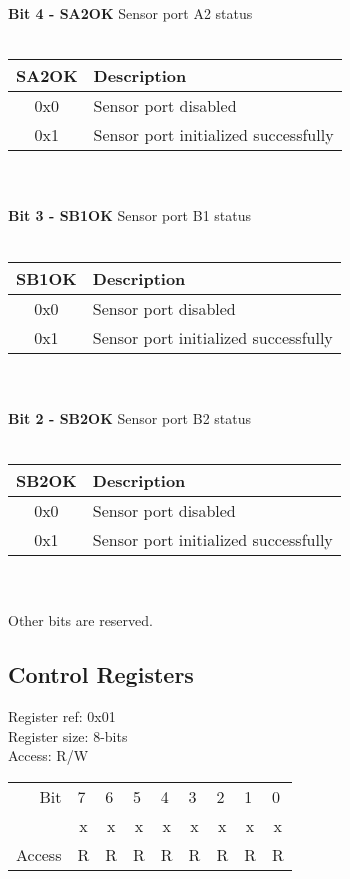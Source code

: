 \textbf{Bit 4 - SA2OK} Sensor port A2 status\\\\
\begin{tabular}{|c|l|}
    \hline
   SA2OK & Description\\ \hline
   0x0 & Sensor port disabled\\ \hline
   0x1 & Sensor port initialized successfully \\ \hline
\end{tabular}\\\\
\textbf{Bit 3 - SB1OK} Sensor port B1 status\\\\
\begin{tabular}{|c|l|}
    \hline
   SB1OK & Description\\ \hline
   0x0 & Sensor port disabled\\ \hline
   0x1 & Sensor port initialized successfully \\ \hline
\end{tabular}\\\\
\textbf{Bit 2 - SB2OK} Sensor port B2 status\\\\
\begin{tabular}{|c|l|}
    \hline
   SB2OK & Description\\ \hline
   0x0 & Sensor port disabled\\ \hline
   0x1 & Sensor port initialized successfully \\ \hline
\end{tabular}\\\\
Other bits are reserved.

\subsection{Control Registers}
Register ref: 0x01\\
Register size: 8-bits\\
Access: R/W\\
\begin{tabular}{rp{1.25cm}p{1.25cm}p{1.25cm}p{1.25cm}p{1.25cm}p{1.25cm}p{1.25cm}p{1.25cm}}
Bit &
  7 &
  6 &
  5 &
  4 &
  3 &
  2 &
  1 &
  0 \\ \cline{2-9} 

\multicolumn{1}{r|}{} &
  \multicolumn{1}{c|}{x} &
  \multicolumn{1}{c|}{x} & 
  \multicolumn{1}{c|}{x} &
  \multicolumn{1}{c|}{x} & 
  \multicolumn{1}{c|}{x} & 
  \multicolumn{1}{c|}{x} &
  \multicolumn{1}{c|}{x} &
  \multicolumn{1}{c|}{x} \\\cline{2-9} 
  
Access &
  R &
  R &
  R &
  R &
  R &
  R &
  R &
  R
\end{tabular}

